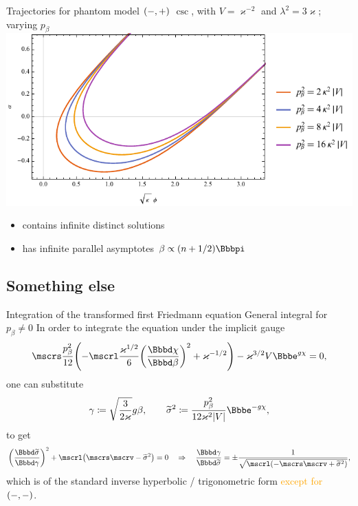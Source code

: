 \documentclass[8pt]{beamer}
\begin{document}
\begin{frame}%
{Trajectories for phantom model ${\left(-,+\right)}$}%
{$\csc$, with $V = \varkappa^{-2}$ and
$\lambda^2 = 3\varkappa$; varying $p_\beta$}
\includegraphics[width=\textwidth]{../plots.nb/csc_pbet_l.pdf}
\begin{itemize}
	\item contains infinite distinct solutions
	\item has infinite parallel asymptotes $\beta \propto \rbr{n+1/2}\pp $
\end{itemize}
\end{frame}

\subsection*{Something else}

\begin{frame}%
{Integration of the transformed first Friedmann equation}%
{General integral for $p_\beta \neq 0$}
In order to integrate the equation under the implicit gauge
\begin{align}
\mscrs\frac{p_\beta^2}{12}\rbr{
-\mscrl\frac{\varkappa^{1/2}}{6}\rbr{\frde{\chi}{\beta}}^2
+\varkappa^{-1/2}}
-\varkappa^{3/2}V\ee^{g\chi} = 0,
\end{align}
one can substitute
\begin{align}
\gamma \coloneqq \sqrt{\frac{3}{2\varkappa}}g\beta, \qquad
\widetilde{\sigma}^2 \coloneqq \frac{p_\beta^2}{12\varkappa^2 \vbr{V}}
\ee^{-g\chi},
\end{align}
to get
\begin{align}
\rbr{\frde{\widetilde{\sigma}}{\gamma}}^2
+\mscrl\rbr{\mscrs\mscrv - \widetilde{\sigma}^2} = 0
\quad\Rightarrow\quad
\frde{\gamma}{\widetilde{\sigma}} = \pm
\frac{1}{\sqrt{\mscrl\rbr{- \mscrs\mscrv + \widetilde{\sigma}^2}}},
\end{align}
which is of the standard inverse hyperbolic / trigonometric form
\textcolor{orange}{except for ${\left(-,-\right)}$}.
\end{frame}
\end{document}
